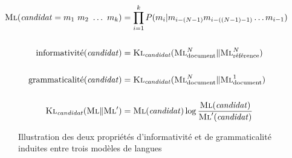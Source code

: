         \begin{align}
          \textsc{Ml}(\text{\textit{candidat}} = m_1\ m_2\ \dots\ m_k) &= \prod_{i = 1}^k P(m_i | m_{i - (N - 1)} m_{i - ((N - 1) - 1)} \dots m_{i - 1}) \label{math:ml}\\
          \notag\\
          \text{informativité}(\text{\textit{candidat}}) &= \textsc{Kl}_{\text{\textit{candidat}}}(\textsc{Ml}_{\text{document}}^{N} \| \textsc{Ml}_{\text{référence}}^{N}) \label{math:informativeness}\\
          \notag\\
          \text{grammaticalité}(\text{\textit{candidat}}) &= \textsc{Kl}_{\text{\textit{candidat}}}(\textsc{Ml}_{\text{document}}^{N} \| \textsc{Ml}_{\text{document}}^{1}) \label{math:phraseness}\\
          \notag\\
          \textsc{Kl}_{\text{\textit{candidat}}}(\textsc{Ml} \| \textsc{Ml}') &= \textsc{Ml}(\text{\textit{candidat}}) \log \frac{\textsc{Ml}(\text{\textit{candidat}})}{\textsc{Ml}'(\text{\textit{candidat}})} \label{math:kullbackleibler}
        \end{align}
        \begin{figure}
          \centering


          \caption{Illustration des deux propriétés d'informativité et de
                   grammaticalité induites entre trois modèles de
                   langues~\cite{tomokiyo2003languagemodel}
                   \label{fig:klml}}
        \end{figure}

